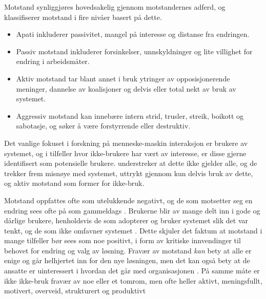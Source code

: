 \noindent
Motstand synliggjøres hovedsakelig gjennom motstandernes adferd, og \citet{Lapointe05} klassifiserer motstand i fire nivåer basert på dette.
 
\begin{itemize}
\item Apati inkluderer passivitet, mangel på interesse og distanse fra endringen.
\item Passiv motstand inkluderer forsinkelser, unnskyldninger og lite villighet for endring i arbeidsmåter.
\item Aktiv motstand tar blant annet i bruk ytringer av opposisjonerende meninger, dannelse av koalisjoner og delvis eller total nekt av bruk av systemet.
\item Aggressiv motstand kan innebære intern strid, trusler, streik, boikott og sabotasje, og søker å være forstyrrende eller destruktiv.
\end{itemize}
 
\noindent
Det vanlige fokuset i forskning på menneske-maskin interaksjon er brukere av systemet, og i tilfeller hvor ikke-brukere har vært av interesse, er disse gjerne identifisert som potensielle brukere. \citet{Satchell09} understreker at dette ikke gjelder alle, og de trekker frem misnøye med systemet, uttrykt gjennom kun delvis bruk av dette, og aktiv motstand som former for ikke-bruk.
 
\noindent
Motstand oppfattes ofte som utelukkende negativt, og de som motsetter seg en endring sees ofte på som gammeldags \citep{Jacobsen12}. Brukerne blir av mange delt inn i gode og  dårlige brukere, henholdsvis de som adopterer og bruker systemet slik det var tenkt, og de som ikke omfavner systemet \citep{Satchell09}. Dette skjuler det faktum at motstand i mange tilfeller bør sees som noe positivt, i form av kritiske innvendinger til behovet for endring og valg av løsning. Fravær av motstand \textit{kan} bety at alle er enige og går helhjertet inn for den nye løsningen, men det kan også bety at de ansatte er uinteressert i hvordan det går med organisasjonen \citep{Jacobsen12}. På samme måte er ikke ikke-bruk fravær av noe eller et tomrom, men ofte heller aktivt, meningsfullt, motivert, overveid, strukturert og produktivt \citep{Satchell09}
 

